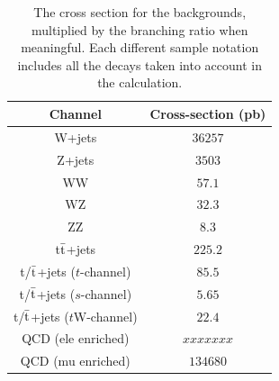 \begin{table}[htb]
  \begin{center}
  \begin{tabular}{c|c}
  \hline
  Channel & Cross-section (pb) \\
  \hline
  W+jets                                               & $36257  $ \\ %
  Z+jets                                               & $3503   $ \\ %
  WW                                                   & $57.1     $ \\ %
  WZ                                                   & $32.3   $ \\ %
  ZZ                                                   & $8.3   $ \\ %
  t$\bar{\textnormal{t}}$+jets                         & $225.2  $ \\ %
  t/$\bar{\textnormal{t}}$+jets ($t$-channel)          & $85.5   $ \\ %
  t/$\bar{\textnormal{t}}$+jets ($s$-channel)          & $5.65   $ \\ %
  t/$\bar{\textnormal{t}}$+jets ($t$W-channel)         & $22.4   $ \\ %
  QCD (ele enriched)                                   & $xxxxxxx$ \\ %
  QCD (mu enriched)                                    & $134680  $ \\ %
  \hline
  \end{tabular}
  \end{center}
  \caption{The cross section for the backgrounds, multiplied by the branching ratio when meaningful.
  Each different sample notation includes all the decays taken into account in the calculation.}
  \label{tab:bkg_XS}
\end{table}%